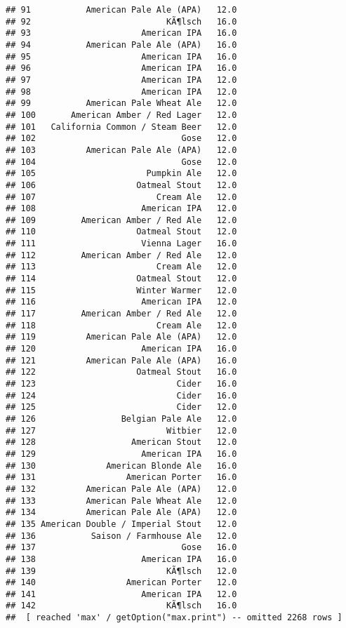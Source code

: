 \documentclass[
]{article}
\begin{document}
\begin{verbatim}
## 91           American Pale Ale (APA)   12.0
## 92                           KÃ¶lsch   16.0
## 93                      American IPA   16.0
## 94           American Pale Ale (APA)   16.0
## 95                      American IPA   16.0
## 96                      American IPA   16.0
## 97                      American IPA   12.0
## 98                      American IPA   12.0
## 99           American Pale Wheat Ale   12.0
## 100       American Amber / Red Lager   12.0
## 101   California Common / Steam Beer   12.0
## 102                             Gose   12.0
## 103          American Pale Ale (APA)   12.0
## 104                             Gose   12.0
## 105                      Pumpkin Ale   12.0
## 106                    Oatmeal Stout   12.0
## 107                        Cream Ale   12.0
## 108                     American IPA   12.0
## 109         American Amber / Red Ale   12.0
## 110                    Oatmeal Stout   12.0
## 111                     Vienna Lager   16.0
## 112         American Amber / Red Ale   12.0
## 113                        Cream Ale   12.0
## 114                    Oatmeal Stout   12.0
## 115                    Winter Warmer   12.0
## 116                     American IPA   12.0
## 117         American Amber / Red Ale   12.0
## 118                        Cream Ale   12.0
## 119          American Pale Ale (APA)   12.0
## 120                     American IPA   16.0
## 121          American Pale Ale (APA)   16.0
## 122                    Oatmeal Stout   16.0
## 123                            Cider   16.0
## 124                            Cider   16.0
## 125                            Cider   12.0
## 126                 Belgian Pale Ale   12.0
## 127                          Witbier   12.0
## 128                   American Stout   12.0
## 129                     American IPA   16.0
## 130              American Blonde Ale   16.0
## 131                  American Porter   16.0
## 132          American Pale Ale (APA)   12.0
## 133          American Pale Wheat Ale   12.0
## 134          American Pale Ale (APA)   12.0
## 135 American Double / Imperial Stout   12.0
## 136           Saison / Farmhouse Ale   12.0
## 137                             Gose   16.0
## 138                     American IPA   16.0
## 139                          KÃ¶lsch   12.0
## 140                  American Porter   12.0
## 141                     American IPA   12.0
## 142                          KÃ¶lsch   16.0
##  [ reached 'max' / getOption("max.print") -- omitted 2268 rows ]
\end{verbatim}
\end{document}
